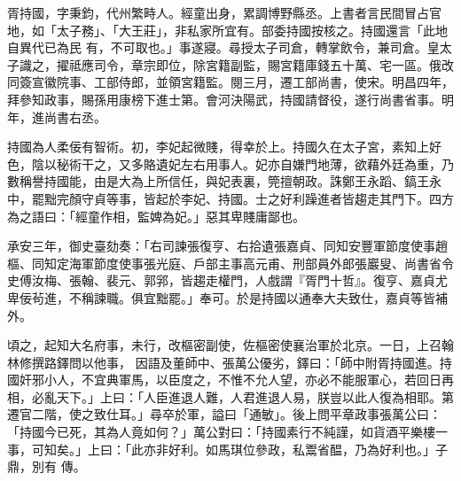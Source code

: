 \begin{pinyinscope}
 胥持國，字秉鈞，代州繁畤人。經童出身，累調博野縣丞。上書者言民間冒占官地，如「太子務」、「大王莊」，非私家所宜有。部委持國按核之。持國還言「此地自異代已為民
 有，不可取也。」事遂寢。尋授太子司倉，轉掌飲令，兼司倉。皇太子識之，擢祗應司令，章宗即位，除宮籍副監，賜宮籍庫錢五十萬、宅一區。俄改同簽宣徽院事、工部侍郎，並領宮籍監。閱三月，遷工部尚書，使宋。明昌四年，拜參知政事，賜孫用康榜下進士第。會河決陽武，持國請督役，遂行尚書省事。明年，進尚書右丞。



 持國為人柔佞有智術。初，李妃起微賤，得幸於上。持國久在太子宮，素知上好色，陰以秘術干之，又多賂遺妃左右用事人。妃亦自嫌門地薄，欲藉外廷為重，乃數稱譽持國能，由是大為上所信任，與妃表裏，筦擅朝政。誅鄭王永蹈、鎬王永
 中，罷黜完顏守貞等事，皆起於李妃、持國。士之好利躁進者皆趨走其門下。四方為之語曰：「經童作相，監婢為妃。」惡其卑賤庸鄙也。



 承安三年，御史臺劾奏：「右司諫張復亨、右拾遺張嘉貞、同知安豐軍節度使事趙樞、同知定海軍節度使事張光庭、戶部主事高元甫、刑部員外郎張巖叟、尚書省令史傅汝梅、張翰、裴元、郭郛，皆趨走權門，人戲謂『胥門十哲』。復亨、嘉貞尤卑佞茍進，不稱諫職。俱宜黜罷。」奉可。於是持國以通奉大夫致仕，嘉貞等皆補外。



 頃之，起知大名府事，未行，改樞密副使，佐樞密使襄治軍於北京。一日，上召翰林修撰路鐸問以他事，
 因語及董師中、張萬公優劣，鐸曰：「師中附胥持國進。持國奸邪小人，不宜典軍馬，以臣度之，不惟不允人望，亦必不能服軍心，若回日再相，必亂天下。」上曰：「人臣進退人難，人君進退人易，朕豈以此人復為相耶。第遷官二階，使之致仕耳。」尋卒於軍，謚曰「通敏」。後上問平章政事張萬公曰：「持國今已死，其為人竟如何？」萬公對曰：「持國素行不純謹，如貨酒平樂樓一事，可知矣。」上曰：「此亦非好利。如馬琪位參政，私鬻省醖，乃為好利也。」子鼎，別有
 傳。



\end{pinyinscope}